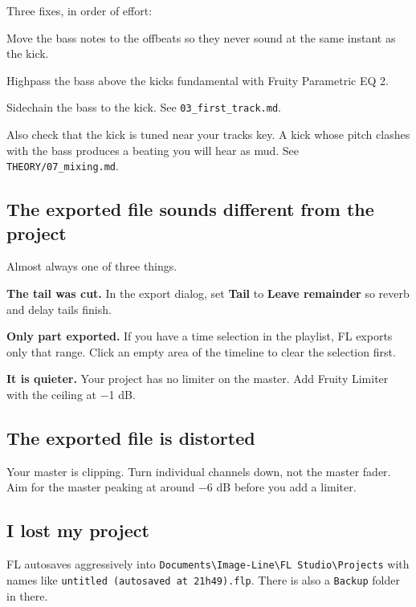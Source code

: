 Three fixes, in order of effort:

Move the bass notes to the offbeats so they never sound at the same instant as the kick.

Highpass the bass above the kick\textquotesingle s fundamental with Fruity Parametric EQ 2.

Sidechain the bass to the kick. See \texttt{03\_first\_track.md}.

Also check that the kick is tuned near your track\textquotesingle s key. A kick whose pitch clashes with the
bass produces a beating you will hear as mud. See \texttt{THEORY/07\_mixing.md}.

\subsection{The exported file sounds different from the project}\label{fl06_trouble-the-exported-file-sounds-different-from-the-project}

Almost always one of three things.

\textbf{The tail was cut.} In the export dialog, set \textbf{Tail} to \textbf{Leave remainder} so reverb and
delay tails finish.

\textbf{Only part exported.} If you have a time selection in the playlist, FL exports only that
range. Click an empty area of the timeline to clear the selection first.

\textbf{It is quieter.} Your project has no limiter on the master. Add Fruity Limiter with the
ceiling at −1 dB.

\subsection{The exported file is distorted}\label{fl06_trouble-the-exported-file-is-distorted}

Your master is clipping. Turn individual channels down, not the master fader. Aim for the
master peaking at around −6 dB before you add a limiter.

\subsection{I lost my project}\label{fl06_trouble-i-lost-my-project}

FL autosaves aggressively into \texttt{Documents\textbackslash{}Image-Line\textbackslash{}FL\ Studio\textbackslash{}Projects} with names like
\texttt{untitled\ (autosaved\ at\ 21h49).flp}. There is also a \texttt{Backup} folder in there.

